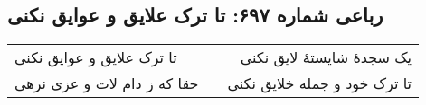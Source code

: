 \begin{center}
\section*{رباعی شماره ۶۹۷: تا ترک علایق و عوایق نکنی}
\label{sec:sh697}
\begin{longtable}{l p{0.5cm} r}
تا ترک علایق و عوایق نکنی
&&
یک سجدهٔ شایستهٔ لایق نکنی
\\
حقا که ز دام لات و عزی نرهی
&&
تا ترک خود و جمله خلایق نکنی
\\
\end{longtable}
\end{center}
